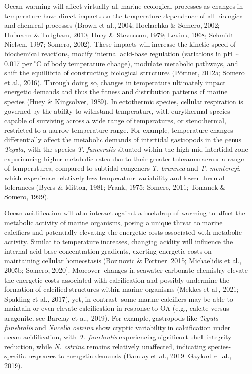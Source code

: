 \documentclass{CSUNthesis}
\begin{document}
Ocean warming will affect virtually all marine ecological processes as changes in temperature have direct impacts on the temperature dependence of all biological and chemical processes (Brown et al., 2004; Hochachka \& Somero, 2002; Hofmann \& Todgham, 2010; Huey \& Stevenson, 1979; Levins, 1968; Schmidt-Nielsen, 1997; Somero, 2002). These impacts will increase the kinetic speed of biochemical reactions, modify internal acid-base regulation (variations in pH \(\sim\) 0.017 per \(^\circ\)C of body temperature change), modulate metabolic pathways, and shift the equillibria of constructing biological structures (Pörtner, 2012a; Somero et al., 2016). Through doing so, changes in temperature ultimately impact energetic demands and thus the fitness and distribution patterns of marine species (Huey \& Kingsolver, 1989). In ectothermic species, cellular respiration is governed by the ability to withstand temperature, with eurythermal species capable of surviving across a wide range of temperatures, or stenothermal, restricted to a narrow temperature range. For example, temperature changes differentially affect the metabolic demands of intertidal gastropods in the genus \textit{Tegula}, with the species \textit{T. funebralis} situated within the high-mid intertidal zone experiencing higher metabolic rates due to their greater tolerance across a range of temperatures, compared to subtidal congeners \textit{T. brunnea} and \textit{T. montereyi}, which experience relatively less temperature variability and lower thermal tolerances (Byers \& Mitton, 1981; Frank, 1975; Somero, 2011; Tomanek \& Somero, 1999).

Ocean acidification will also interact against a backdrop of warming to affect the metabolic activity of marine organisms, posing a unique threat to marine calcifiers and potentially elevating the energetic costs associated with metabolic activity. Similar to temperature increases, changing acidity will influence the internal acid-base concentration gradients, exerting energetic costs on maintaining cellular homeostasis (Bozinovic \& Pörtner, 2015; Michaelidis et al., 2005b; Somero, 2020). Moreover, changes in seawater carbonate chemistry elevate the energetic costs associated with calcification and possibly undermine the formation of calcified structures within marine organisms (Mekkes et al., 2021; Spalding et al., 2017), yet, in contrast, some marine calcifiers may be able to maintain or even elevate calcification in response to OA (e.g., calcite versus aragonite, see Barclay et al., 2019). For example, gastropods like \textit{Tegula funebralis} and \textit{Nucella ostrina} show cryptic variability in calcification under ocean acidification, with \textit{T. funebralis} experiencing significant shell integrity reduction, while \textit{N. ostrina} remains relatively unaffected, indicating species-specific responses to energetic demands (Barclay et al., 2019; Gaylord et al., 2019).
\end{document}
